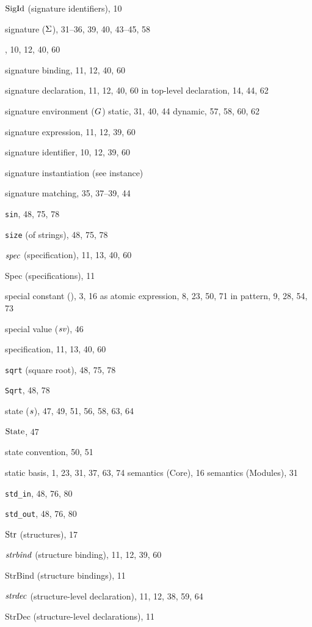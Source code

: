 \begin{theindex}
\item ${\rm SigId}$ (signature identifiers), 10
\item signature ($\Sigma$), 31--36, 39, 40, 43--45, 58
\item \SIGNATURE, 10, 12, 40, 60
\item signature binding, 11, 12, 40, 60
\item signature declaration, 11, 12, 40, 60
\subitem in top-level declaration, 14, 44, 62
\item signature environment ($G$) 
\subitem static, 31, 40, 44
\subitem dynamic, 57, 58, 60, 62
\item signature expression, 11, 12, 39, 60
\item signature identifier, 10, 12, 39, 60
\item signature instantiation (see instance) 
\item signature matching, 35, 37--39, 44
\item {\tt sin}, 48, 75, 78
\item {\tt size} (of strings), 48, 75, 78
\item ${\it spec}$ (specification), 11, 13, 40, 60
\item Spec (specifications), 11
\item special constant (\scon), 3, 16
\subitem as atomic expression, 8, 23, 50, 71
\subitem in pattern, 9, 28, 54, 73
\item special value ($\mbox{\it sv}$), 46
\item specification, 11, 13, 40, 60
\item {\tt sqrt} (square root), 48, 75, 78
\item {\tt Sqrt}, 48, 78
\item state ($s$), 47, 49, 51, 56, 58, 63, 64
\item ${\rm State}$, 47
\item state convention, 50, 51
\item static 
\subitem basis, 1, 23, 31, 37, 63, 74
\subitem semantics (Core), 16
\subitem semantics (Modules), 31
\item \verb+std_in+, 48, 76, 80
\item \verb+std_out+, 48, 76, 80
\item ${\rm Str}$ (structures), 17
\item ${\it strbind}$ (structure binding), 11, 12, 39, 60
\item StrBind (structure bindings), 11
\item ${\it strdec}$ (structure-level declaration), 11, 12, 38, 59, 64
\item StrDec (structure-level declarations), 11

\end{theindex}
